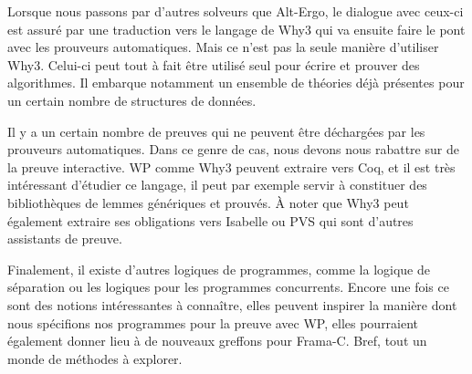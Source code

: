 Lorsque nous passons par d'autres solveurs que Alt-Ergo, le dialogue avec ceux-ci
est assuré par une traduction vers le langage de Why3 qui va ensuite faire le pont
avec les prouveurs automatiques. Mais ce n'est pas la seule manière d'utiliser 
Why3. Celui-ci peut tout à fait être utilisé seul pour écrire et prouver des
algorithmes. Il embarque notamment un ensemble de théories déjà présentes pour un
certain nombre de structures de données.



Il y a un certain nombre de preuves qui ne peuvent être déchargées par les 
prouveurs automatiques. Dans ce genre de cas, nous devons nous rabattre sur de la 
preuve interactive. WP comme Why3 peuvent extraire vers Coq, et il est très
intéressant d'étudier ce langage, il peut par exemple servir à constituer des 
bibliothèques de lemmes génériques et prouvés. À noter que Why3 peut également
extraire ses obligations vers Isabelle ou PVS qui sont d'autres assistants de
preuve.



Finalement, il existe d'autres logiques de programmes, comme la logique de 
séparation ou les logiques pour les programmes concurrents. Encore une fois ce
sont des notions intéressantes à connaître, elles peuvent inspirer la manière dont
nous spécifions nos programmes pour la preuve avec WP, elles pourraient également
donner lieu à de nouveaux greffons pour Frama-C. Bref, tout un monde de méthodes à
explorer.
